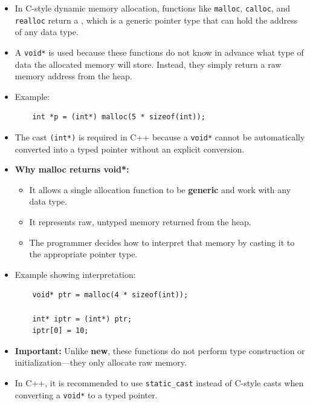 \documentclass[10pt]{article}
\newcommand{\pbreak}{\vspace{30pt}}
\newcommand{\vocab}[1]{\fbox{\textbf{\textit{#1}}}}
\begin{document}
\begin{itemize}
	\item In C-style dynamic memory allocation, functions like \verb|malloc|, \verb|calloc|, and \verb|realloc| return a \vocab{void pointer (void*)}, which is a generic pointer type that can hold the address of any data type.

	\item A \verb|void*| is used because these functions do not know in advance what type of data the allocated memory will store. Instead, they simply return a raw memory address from the heap.

	\item Example:
	\begin{verbatim}
	int *p = (int*) malloc(5 * sizeof(int));
	\end{verbatim}

	\item The cast \verb|(int*)| is required in C++ because a \verb|void*| cannot be automatically converted into a typed pointer without an explicit conversion.

	\item \textbf{Why malloc returns void*:}
	\begin{itemize}
		\item It allows a single allocation function to be \textbf{generic} and work with any data type.
		\item It represents raw, untyped memory returned from the heap.
		\item The programmer decides how to interpret that memory by casting it to the appropriate pointer type.
	\end{itemize}

	\item Example showing interpretation:
	\begin{verbatim}
	void* ptr = malloc(4 * sizeof(int));

	int* iptr = (int*) ptr;
	iptr[0] = 10;
	\end{verbatim}

	\item \textbf{Important:} Unlike \textbf{new}, these functions do not perform type construction or initialization—they only allocate raw memory.

	\pbreak

	\item In C++, it is recommended to use \verb|static_cast| instead of C-style casts when converting a \verb|void*| to a typed pointer.


\end{itemize}
\end{document}
